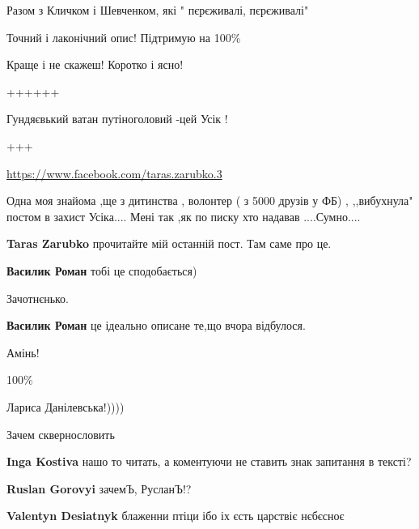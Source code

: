 \begin{itemize}
Разом з Кличком і Шевченком, які " пєрєживалі, пєрєживалі"

Точний і лаконічний опис!
Підтримую на 100\%

Краще і не скажеш!
Коротко і ясно!

++++++

Гундяєвький ватан путіноголовий -цей Усік !

+++


\url{https://www.facebook.com/taras.zarubko.3}\par

Одна моя знайома ,ще з дитинства , волонтер ( з 5000 друзів у ФБ) , ,,вибухнула" постом в захист Усіка....
Мені так ,як по писку хто надавав ....Сумно....

\begin{itemize} %
\textbf{Taras Zarubko} прочитайте мій останній пост. Там саме про це.
\end{itemize} %

\textbf{Василик Роман} тобі це сподобається)

Зачотнєнько.

\begin{itemize} %
\textbf{Василик Роман} це ідеально описане те,що вчора відбулося.
\end{itemize} %

Амінь!

100\%

Лариса Данілевська!))))

Зачем сквернословить

\begin{itemize} %
\textbf{Inga Kostiva} нашо то читать, а коментуючи не ставить знак запитання в тексті?

\textbf{Ruslan Gorovyi} зачемЪ, РусланЪ!?

\textbf{Valentyn Desiatnyk} блаженни птіци ібо іх єсть царствіє нєбєсноє


\end{itemize}
\end{itemize}
